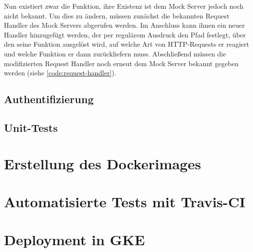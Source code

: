 

Nun existiert zwar die Funktion, ihre Existenz ist dem Mock Server jedoch noch nicht bekannt.
Um dies zu ändern, müssen zunächst die bekannten Request Handler des Mock Servers abgerufen werden.
Im Anschluss kann ihnen ein neuer Handler hinzugefügt werden, der per regulärem Ausdruck den Pfad festlegt, über den seine Funktion ausgelöst wird, auf welche Art von \ac{HTTP}-Requests er reagiert und welche Funktion er dann zurückliefern muss.
Abschließend müssen die modifizierten Request Handler noch erneut dem Mock Server bekannt gegeben werden (siehe \autoref{code:request-handler}).




\subsection{Authentifizierung}

\subsection{Unit-Tests}


\section{Erstellung des Dockerimages}


\section{Automatisierte Tests mit Travis-CI}


\section{Deployment in \ac{GKE}}